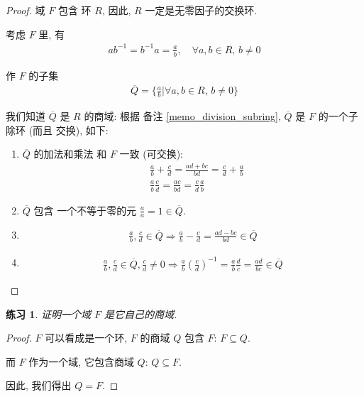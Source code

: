 \documentclass[utf8]{ctexbook}
\newtheorem{exercise}{练习}[section]
\begin{document}
\begin{proof}
域 $F$ 包含 环 $R$, 因此, $R$ 一定是无零因子的交换环.

考虑 $F$ 里, 有
\begin{align*}
a b^{-1} = b^{-1} a = \frac{a}{b} , \quad \forall a , b \in R, \, b \neq 0
\end{align*}

作 $F$ 的子集
\begin{align*}
\overline{Q} = \{ \frac{a}{b} |  \forall a , b \in R, \, b \neq 0 \}
\end{align*}

我们知道 $\overline{Q}$ 是 $R$ 的商域: 根据 备注 \ref{memo_division_subring}, $\overline{Q}$ 是 $F$ 的一个子除环 (而且 交换), 如下:
\begin{enumerate}
\item{$\overline{Q}$ 的加法和乘法 和 $F$ 一致 (可交换):
\begin{align*}
& \frac{a}{b} + \frac{c}{d} = \frac{ad + bc}{bd} =  \frac{c}{d} + \frac{a}{b}\\
& \frac{a}{b} \frac{c}{d} = \frac{ac}{bd} = \frac{c}{d} \frac{a}{b}
\end{align*}
}
\item{$\overline{Q}$ 包含 一个不等于零的元 $\frac{a}{a} = 1 \in \overline{Q}$.}
\item{
\begin{align*}
\frac{a}{b}, \frac{c}{d} \in \overline{Q} \Longrightarrow \frac{a}{b} - \frac{c}{d} = \frac{ad - bc}{bd} \in \overline{Q}
\end{align*}
}
\item{
\begin{align*}
\frac{a}{b}, \frac{c}{d} \in \overline{Q} , \frac{c}{d} \neq 0 \Longrightarrow \frac{a}{b} \left( \frac{c}{d} \right)^{-1} = \frac{a}{b} \frac{d}{c} = \frac{a d}{b c} \in \overline{Q} 
\end{align*}
}
\end{enumerate}
\end{proof}

\begin{exercise}
证明一个域 $F$ 是它自己的商域.
\end{exercise}


\begin{proof}
$F$ 可以看成是一个环, $F$ 的商域 $Q$ 包含 $F$: $F \subseteq Q$. 

而 $F$ 作为一个域, 它包含商域 $Q$: $Q \subseteq F$.

因此, 我们得出 $Q = F$.
\end{proof}
\end{document}
